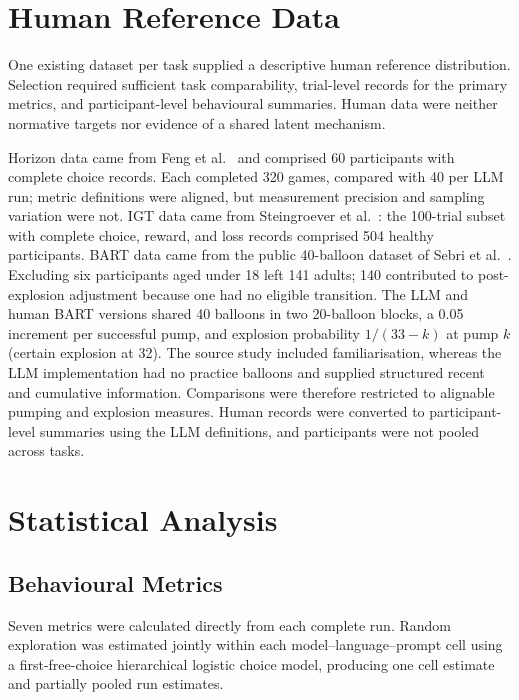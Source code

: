 \documentclass[logo,msc]{infthesis}
\begin{document}
\section{Human Reference Data}

One existing dataset per task supplied a descriptive human reference distribution. Selection required sufficient task comparability, trial-level records for the primary metrics, and participant-level behavioural summaries. Human data were neither normative targets nor evidence of a shared latent mechanism.

Horizon data came from Feng et al.~\cite{Feng2021ExploreExploit} and comprised 60 participants with complete choice records. Each completed 320 games, compared with 40 per LLM run; metric definitions were aligned, but measurement precision and sampling variation were not. IGT data came from Steingroever et al.~\cite{Steingroever2015IGTData}: the 100-trial subset with complete choice, reward, and loss records comprised 504 healthy participants. BART data came from the public 40-balloon dataset of Sebri et al.~\cite{Sebri2023BART}. Excluding six participants aged under 18 left 141 adults; 140 contributed to post-explosion adjustment because one had no eligible transition. The LLM and human BART versions shared 40 balloons in two 20-balloon blocks, a 0.05 increment per successful pump, and explosion probability $1/(33-k)$ at pump $k$ (certain explosion at 32). The source study included familiarisation, whereas the LLM implementation had no practice balloons and supplied structured recent and cumulative information. Comparisons were therefore restricted to alignable pumping and explosion measures. Human records were converted to participant-level summaries using the LLM definitions, and participants were not pooled across tasks.

\section{Statistical Analysis}

\subsection{Behavioural Metrics}

Seven metrics were calculated directly from each complete run. Random exploration was estimated jointly within each model--language--prompt cell using a first-free-choice hierarchical logistic choice model, producing one cell estimate and partially pooled run estimates.
\end{document}
